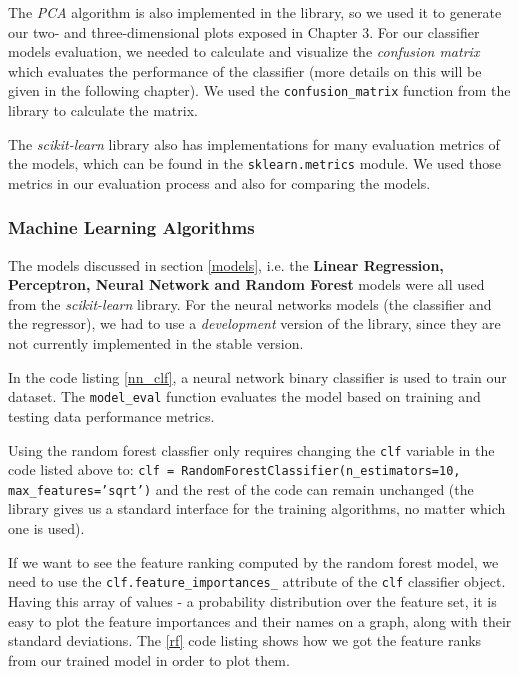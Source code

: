 The {\it PCA} algorithm is also implemented in the library, so we used it to 
generate our two- and three-dimensional plots exposed in Chapter 3. For our 
classifier models evaluation, we needed to calculate and visualize the 
{\it confusion matrix} which evaluates the performance of the classifier 
(more details on this will be given in the following chapter). We used the 
\texttt{confusion\_matrix} function from the library to calculate the matrix. 

The {\it scikit-learn} library also has implementations for many evaluation 
metrics of the models, which can be found in the \texttt{sklearn.metrics} 
module. We used those metrics in our evaluation process and also for comparing the 
models.

\subsubsection{Machine Learning Algorithms}

The models discussed in section \ref{models}, i.e. the {\bf Linear Regression, 
Perceptron, Neural Network and Random Forest} models were all used from the 
{\it scikit-learn} library. For the neural networks models (the classifier and 
the regressor), we had to use a {\it development} version of the library, since 
they are not currently implemented in the stable version. 

In the code listing \ref{nn_clf}, a neural network binary classifier is used 
to train our dataset. The \texttt{model\_eval} function evaluates the model 
based on training and testing data performance metrics. 



Using the random forest classfier only requires changing the \texttt{clf} 
variable in the code listed above to: \texttt{clf = RandomForestClassifier(n\_estimators=10, 
max\_features='sqrt')} and the rest of the code can remain unchanged (the library 
gives us a standard interface for the training algorithms, no matter which one 
is used). 

If we want to see the feature ranking computed by the random forest model, we 
need to use the \texttt{clf.feature\_importances\_} attribute of the \texttt{clf} 
classifier object. Having this array of values - a probability distribution over 
the feature set, it is easy to plot the feature importances and their names on 
a graph, along with their standard deviations. The \ref{rf} code listing shows 
how we got the feature ranks from our trained model in order to plot them. 

